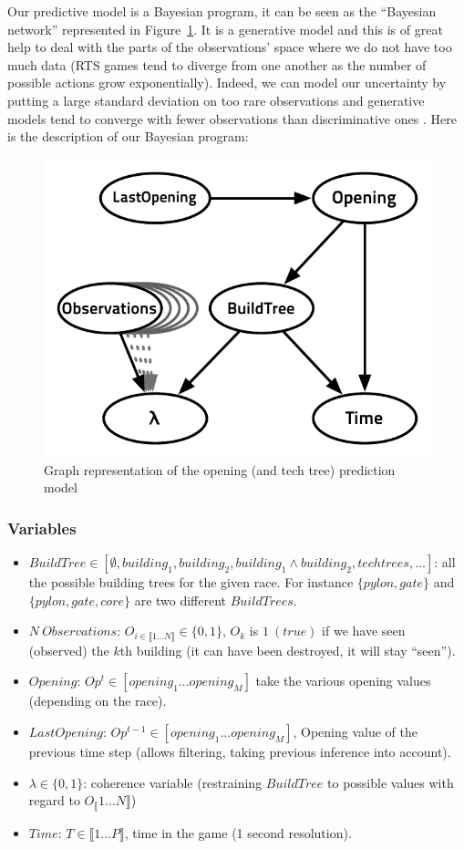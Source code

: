Our predictive model is a Bayesian program, it can be seen as the ``Bayesian network'' represented in Figure~\ref{BNPrediction}. It is a generative model and this is of great help to deal with the parts of the observations' space where we do not have too much data (RTS games tend to diverge from one another as the number of possible actions grow exponentially). Indeed, we can model our uncertainty by putting a large standard deviation on too rare observations and generative models tend to converge with fewer observations than discriminative ones \citep{Jordan}. Here is the description of our Bayesian program:

\begin{figure}[htp]
\centerline{\includegraphics[width=0.6\columnwidth]{images/OpeningPrediction2.pdf}}
\caption{Graph representation of the opening (and tech tree) prediction model}
\label{BNPrediction}
\end{figure}

\subsubsection{Variables}
\begin{itemize}
\item $BuildTree \in [\emptyset, building_1, building_2, building_1\wedge building_2, techtrees, \dots]$: all the possible building trees for the given race. For instance $\{pylon, gate\}$ and $\{pylon, gate, core\}$ are two different $BuildTrees$.
\item $N\ Observations$: $O_{i \in \llbracket 1\dots N \rrbracket} \in \{0, 1\}$, $O_k$ is $1\ (true)$ if we have seen (observed) the $k$th building (it can have been destroyed, it will stay ``seen'').
\item $Opening$: $Op^t \in [opening_1 \dots opening_M]$ take the various opening values (depending on the race).
\item $LastOpening$: $Op^{t-1} \in [opening_1 \dots opening_M]$, Opening value of the previous time step (allows filtering, taking previous inference into account).
\item $\lambda \in \{0, 1\}$: coherence variable (restraining $BuildTree$ to possible values with regard to $O_\llbracket 1 \dots N \rrbracket$)
\item $Time$: $T \in \llbracket 1\dots P \rrbracket$, time in the game (1 second resolution).
\end{itemize}

